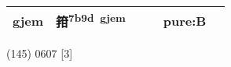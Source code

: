 \documentclass[14pt,a4paper]{scrartcl}
\begin{document}
\begin{longtable}[c]{@{}llllll@{}}
\begin{minipage}[t]{0.14\columnwidth}\raggedright\strut
gjem
\strut\end{minipage} &
\begin{minipage}[t]{0.14\columnwidth}\raggedright\strut
箝\textsuperscript{7b9d~gjem}
\strut\end{minipage} &
\begin{minipage}[t]{0.14\columnwidth}\raggedright\strut
\strut\end{minipage} &
\begin{minipage}[t]{0.14\columnwidth}\raggedright\strut
\strut\end{minipage} &
\begin{minipage}[t]{0.14\columnwidth}\raggedright\strut
pure:B
\strut\end{minipage}\tabularnewline
\bottomrule
\end{longtable}

(145) 0607 {[}3{]}
\end{document}
